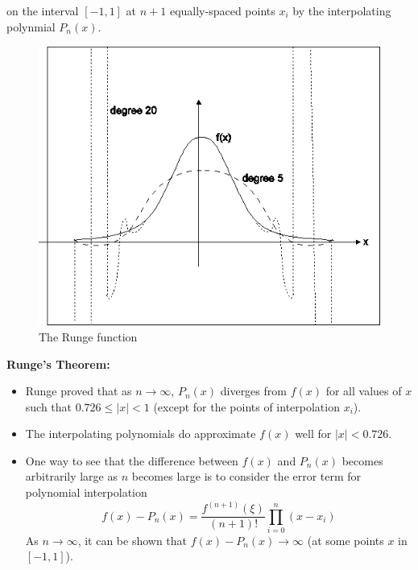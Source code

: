 \documentclass [titlepage,12pt,letter] {article}
\begin{document}
\noindent
on the interval $[-1,1]$ at $n+1$ equally-spaced points $x_i$ by the interpolating polynmial $P_n(x)$.



\begin{figure} 
  \centering
  \includegraphics[scale=0.6]{runge}
  \caption{The Runge function}
  \label{fig:runge}
\end{figure}


{\bf Runge's Theorem:}
\begin{itemize}
\item{Runge proved that as $n \rightarrow \infty$, $P_n(x)$ diverges from $f(x)$ for all values of $x$ such that $0.726 \leq |x| < 1$ (except for the points of interpolation $x_i$).}
\item{The interpolating polynomials do approximate $f(x)$ well for $|x|<0.726$.}
\item{One way to see that the difference between $f(x)$ and $P_n(x)$ becomes arbitrarily large as $n$ becomes large is to consider the error term for polynomial interpolation
\[
f(x)-P_n(x) = \frac{f^{(n+1)}(\xi)}{(n+1)!} \prod_{i=0}^{n} (x - x_i)
\]
\noindent
As $n \rightarrow \infty$, it can be shown that $f(x)-P_n(x) \rightarrow \infty$ (at some points $x$ in $[-1,1]$).}
\end{itemize}
\end{document}
